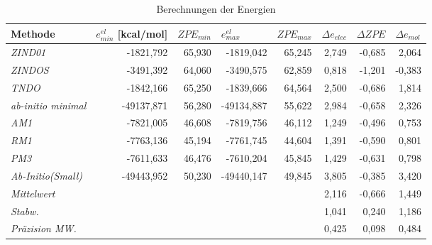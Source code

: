 \begin{table}[H]
  \centering
  \caption{Berechnungen der Energien}
  \begin{tabular}{lrrrrrrr}
    \toprule
    \textbf{Methode} & \multicolumn{1}{l}{\boldmath{}\textbf{$e^{el}_{min}$ [kcal/mol]}\unboldmath{}} & \multicolumn{1}{l}{\boldmath{}\textbf{$ZPE_{min}$}\unboldmath{}} & \multicolumn{1}{l}{\boldmath{}\textbf{$e^{el}_{max}$}\unboldmath{}} & \multicolumn{1}{l}{\boldmath{}\textbf{$ZPE_{max}$}\unboldmath{}} & \multicolumn{1}{l}{\boldmath{}\textbf{$\Delta e_{elec}$}\unboldmath{}} & \multicolumn{1}{l}{\boldmath{}\textbf{$\Delta ZPE$}\unboldmath{}} & \multicolumn{1}{l}{\boldmath{}\textbf{$\Delta e_{mol}$}\unboldmath{}} \\
    \midrule
    \textit{ZIND01} & -1821,792 & 65,930 & -1819,042 & 65,245 & 2,749 & -0,685 & 2,064 \\
    \textit{ZINDOS} & -3491,392 & 64,060 & -3490,575 & 62,859 & 0,818 & -1,201 & -0,383 \\
    \textit{TNDO} & -1842,166 & 65,250 & -1839,666 & 64,564 & 2,500 & -0,686 & 1,814 \\
    \textit{ab-initio minimal} & -49137,871 & 56,280 & -49134,887 & 55,622 & 2,984 & -0,658 & 2,326 \\
    \midrule
    \textit{AM1} & -7821,005 & 46,608 & -7819,756 & 46,112 & 1,249 & -0,496 & 0,753 \\
    \textit{RM1} & -7763,136 & 45,194 & -7761,745 & 44,604 & 1,391 & -0,590 & 0,801 \\
    \textit{PM3} & -7611,633 & 46,476 & -7610,204 & 45,845 & 1,429 & -0,631 & 0,798 \\
    \textit{Ab-Initio(Small)} & -49443,952 & 50,230 & -49440,147 & 49,845 & 3,805 & -0,385 & 3,420 \\
    \midrule
    \midrule
    \textit{Mittelwert} &       &       &       &       & 2,116 & -0,666 & 1,449 \\
    \textit{Stabw.} &       &       &       &       & 1,041 & 0,240 & 1,186 \\
    \textit{Präzision MW.} &       &       &       &       & 0,425 & 0,098 & 0,484 \\
    \bottomrule
    \end{tabular}%
  \label{tab:addlabel}%
\end{table}%
